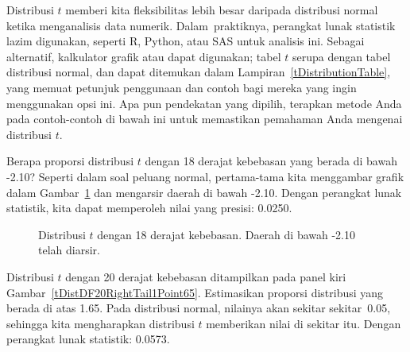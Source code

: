 
Distribusi $t$ memberi kita fleksibilitas lebih besar daripada
distribusi normal ketika menganalisis data numerik.
Dalam~praktiknya, perangkat lunak statistik lazim digunakan,
seperti R, Python, atau SAS untuk analisis ini.
Sebagai alternatif, kalkulator grafik atau
 dapat digunakan;
tabel $t$ serupa dengan tabel distribusi normal,
dan dapat ditemukan dalam Lampiran~\ref{tDistributionTable},
yang memuat petunjuk penggunaan dan contoh
bagi mereka yang ingin menggunakan opsi ini.
Apa pun pendekatan yang dipilih, terapkan metode Anda
pada contoh-contoh di bawah ini untuk memastikan
pemahaman Anda mengenai distribusi $t$.

\begin{examplewrap}
\begin{nexample}{Berapa proporsi distribusi $t$
    dengan 18 derajat kebebasan yang berada di bawah -2.10?}
  Seperti dalam soal peluang normal, pertama-tama kita menggambar
  grafik dalam Gambar~\ref{tDistDF18LeftTail2Point10}
  dan mengarsir daerah di bawah -2.10.
  Dengan perangkat lunak statistik, kita dapat memperoleh
  nilai yang presisi: 0.0250.
\end{nexample}
\end{examplewrap}

\begin{figure}
  \centering
  \caption{Distribusi $t$ dengan 18 derajat kebebasan.
      Daerah di bawah -2.10 telah diarsir.}
  \label{tDistDF18LeftTail2Point10}
\end{figure}

\begin{examplewrap}
\begin{nexample}{Distribusi $t$ dengan 20 derajat kebebasan
    ditampilkan pada panel kiri
    Gambar~\ref{tDistDF20RightTail1Point65}.
    Estimasikan proporsi distribusi yang berada
    di atas 1.65.}
  Pada distribusi normal, nilainya akan sekitar
  sekitar~0.05, sehingga kita mengharapkan distribusi $t$
  memberikan nilai di sekitar itu.
  Dengan perangkat lunak statistik: 0.0573.
\end{nexample}
\end{examplewrap}

